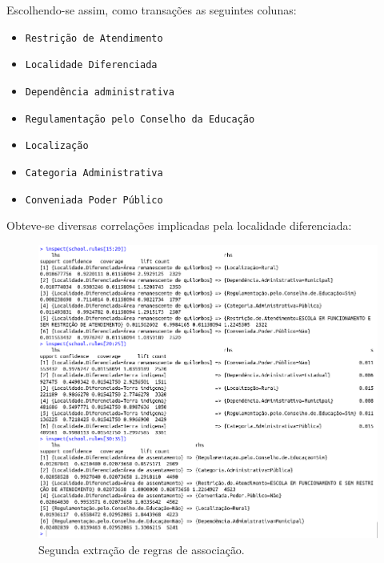 \documentclass{article}[twocolumn]
\begin{document}
	Escolhendo-se assim, como transa\c{c}\~oes as seguintes colunas:
	\begin{itemize}
		\item \texttt{Restri\c{c}\~ao de Atendimento}
		\item \texttt{Localidade Diferenciada}
		\item \texttt{Depend\^encia administrativa}
		\item \texttt{Regulamenta\c{c}\~ao pelo Conselho da Educa\c{c}\~ao}
		\item \texttt{Localiza\c{c}\~ao}
		\item \texttt{Categoria Administrativa}
		\item \texttt{Conveniada Poder P\'ublico}
	\end{itemize}
	Obteve-se diversas correla\c{c}\~oes implicadas pela localidade diferenciada:
	\begin{figure}[H]
		\centering
		\includegraphics[width=\textwidth]{figures/extraction2.png}
		\caption{Segunda extra\c{c}\~ao de regras de associa\c{c}\~ao.}
	\end{figure}
\end{document}

